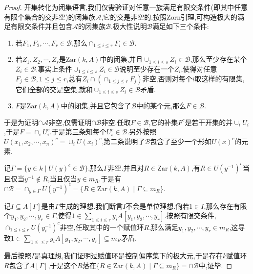 \begin{enumerate}
\begin{enumerate}[(1)]
\begin{proof}
    		开集转化为闭集语言,我们仅需验证对任意一族满足有限交条件(即其中任意有限个集合的交非空)的闭集族$\mathscr{A}$,它的交是非空的.按照Zorn引理,可构造极大的满足有限交条件并且包含$\mathscr{A}$的闭集族$\mathscr{B}$.极大性说明$\mathscr{B}$满足如下三个条件:
    		\begin{enumerate}
    			\item 若$F_1,F_2,\cdots,F_r\in\mathscr{B}$,那么$\cap_{1\le i\le r}F_i\in\mathscr{B}$.
    			\item 若$Z_1,Z_2,\cdots,Z_s$是$\mathrm{Zar}(k,A)$中的闭集,并且$\cup_{1\le i\le s}Z_i\in\mathscr{B}$,那么至少存在某个$Z_i\in\mathscr{B}$.事实上条件$\cup_{1\le i\le s}Z_i\in\mathscr{B}$说明至少存在一个$Z_i$,使得对任意$F_j\in\mathscr{B},1\le j\le r$,总有$Z_i\cap(\cap_{1\le j\le r}F_j)$非空,否则对每个$i$取这样的有限集,它们全部的交是空集,就和$\cup_{1\le i\le s}Z_i\in\mathscr{B}$矛盾.
    			\item $F$是$\mathrm{Zar}(k,A)$中的闭集,并且它包含了$\mathscr{B}$中的某个元,那么$F\in\mathscr{B}$.
    		\end{enumerate}
    		
    		于是为证明$\cap\mathscr{A}$非空,仅需证明$\cap\mathscr{B}$非空.任取$F\in\mathscr{B}$,它的补集$F^c$是若干开集的并$\cup_iU_i$,于是$F=\cap_iU_i^c$.于是第三条知每个$U_i^c\in\mathscr{B}$.另外按照$U(x_1,x_2,\cdots,x_n)^c=\cup_iU(x_i)^c$,第二条说明了$\mathscr{B}$包含了至少一个形如$U(x)^c$的元素.
    		
    		记$\Gamma=\{y\in k\mid U(y)^c\in\mathscr{B}\}$,那么$\Gamma$非空.并且对$R\in\mathrm{Zar}(k,A)$,有$R\in U(y^{-1})^c$当且仅当$y^{-1}\not\in R$,当且仅当$y\in m_R$.于是有$\cap\mathscr{B}=\cap_{y\in\Gamma}U(y^{-1})^c=\{R\in\mathrm{Zar}(k,A)\mid\Gamma\subseteq m_R\}$.
    		
    		记$I\subseteq A[\Gamma]$是由$\Gamma$生成的理想.我们断言$I$不会是单位理想.倘若$1\in I$,那么存在有限个$y_1,y_2,\cdots,y_r\in\Gamma$,使得$1\in\sum_{1\le i\le r}y_iA[y_1,y_2,\cdots,y_r]$.按照有限交条件,$\cap_{1\le i\le r}U(y_i^{-1})^c$非空,任取其中的一个赋值环$R$,那么满足$y_1,y_2,\cdots,y_r\in m_R$,这导致$1\in\sum_{1\le \le r}y_iA[y_1,y_2,\cdots,y_r]\subseteq m_R$矛盾.
    		
    		最后按照$I$是真理想,我们证明过赋值环是控制偏序集下的极大元,于是存在$k$赋值环$R$包含了$A[\Gamma]$,于是这个$R$落在$\{R\in\mathrm{Zar}(k,A)\mid\Gamma\subseteq m_R\}=\cap\mathscr{B}$中,证毕.
    	\end{proof}
    \end{enumerate}
\end{enumerate}
